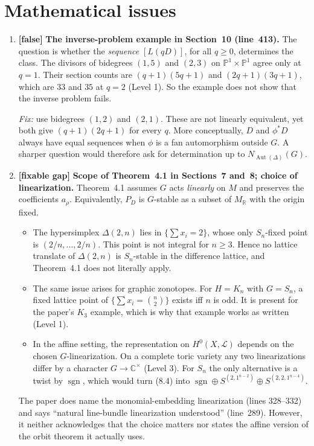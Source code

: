 \documentclass[12pt,letterpaper]{article}
\DeclareMathOperator{\Aut}{Aut}
\newcommand{\CC}{\mathbb C}
\newcommand{\PP}{\mathbb P}
\newcommand{\level}[1]{\textsf{Level #1}}
\newcommand{\verdict}[1]{\textbf{[#1]}}
\begin{document}
\section{Mathematical issues}\label{sec:major}
\begin{enumerate}[label=\textbf{\arabic*.}]
\item \verdict{false} \textbf{The inverse-problem example in Section~10 (line~413).}  The question is whether the \emph{sequence} $[L(qD)]$, for all $q\ge0$, determines the class.  The divisors of bidegrees $(1,5)$ and $(2,3)$ on $\PP^1\times\PP^1$ agree only at $q=1$.  Their section counts are $(q+1)(5q+1)$ and $(2q+1)(3q+1)$, which are $33$ and $35$ at $q=2$ (\level{1}).  So the example does not show that the inverse problem fails.

\emph{Fix:} use bidegrees $(1,2)$ and $(2,1)$.  These are not linearly equivalent, yet both give $(q+1)(2q+1)$ for every $q$.  More conceptually, $D$ and $\phi^*D$ always have equal sequences when $\phi$ is a fan automorphism outside $G$.  A sharper question would therefore ask for determination up to $N_{\Aut(\Delta)}(G)$.

\item \verdict{fixable gap} \textbf{Scope of Theorem~4.1 in Sections~7 and~8; choice of linearization.}  Theorem~4.1 assumes $G$ acts \emph{linearly} on $M$ and preserves the coefficients $a_\rho$.  Equivalently, $P_D$ is $G$-stable as a subset of $M_{\mathbb R}$ with the origin fixed.
\begin{itemize}
\item The hypersimplex $\Delta(2,n)$ lies in $\{\sum x_i=2\}$, whose only $S_n$-fixed point is $(2/n,\dots,2/n)$.  This point is not integral for $n\ge3$.  Hence no lattice translate of $\Delta(2,n)$ is $S_n$-stable in the difference lattice, and Theorem~4.1 does not literally apply.
\item The same issue arises for graphic zonotopes.  For $H=K_n$ with $G=S_n$, a fixed lattice point of $\{\sum x_i=\binom n2\}$ exists iff $n$ is odd.  It is present for the paper's $K_3$ example, which is why that example works as written (\level{1}).
\item In the affine setting, the representation on $H^0(X,\mathcal L)$ depends on the chosen $G$-linearization.  On a complete toric variety any two linearizations differ by a character $G\to\CC^\times$ (\level{3}).  For $S_n$ the only alternative is a twist by $\operatorname{sgn}$, which would turn (8.4) into $\operatorname{sgn}\oplus S^{(2,1^{n-2})}\oplus S^{(2,2,1^{n-4})}$.
\end{itemize}
The paper does name the monomial-embedding linearization (lines 328--332) and says ``natural line-bundle linearization understood'' (line~289).  However, it neither acknowledges that the choice matters nor states the affine version of the orbit theorem it actually uses.


\end{enumerate}
\end{document}
